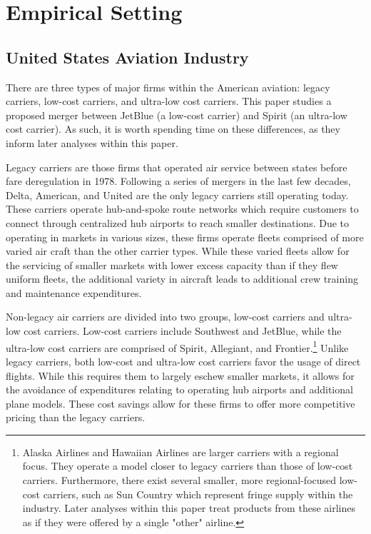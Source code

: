 \documentclass{article}
\begin{document}
	
	\section{Empirical Setting}
	\label{sec:Setting}
	
	
	\subsection{United States Aviation Industry}
	\label{sec:Setting_Aviation}
	There are three types of major firms within the American aviation: legacy carriers, low-cost carriers, and ultra-low cost carriers. This paper studies a proposed merger between JetBlue (a low-cost carrier) and Spirit (an ultra-low cost carrier). As such, it is worth spending time on these differences, as they inform later analyses within this paper. 	
    
	Legacy carriers are those firms that operated air service between states before fare deregulation in 1978. Following a series of mergers in the last few decades, Delta, American, and United are the only legacy carriers still operating today. These carriers operate hub-and-spoke route networks which require customers to connect through centralized hub airports to reach smaller destinations. Due to operating in markets in various sizes, these firms operate fleets comprised of more varied air craft than the other carrier types. While these varied fleets allow for the servicing of smaller markets with lower excess capacity than if they flew uniform fleets, the additional variety in aircraft leads to additional crew training and maintenance expenditures.   
	
	Non-legacy air carriers are divided into two groups, low-cost carriers and ultra-low cost carriers. Low-cost carriers include Southwest and JetBlue, while the ultra-low cost carriers are comprised of Spirit, Allegiant, and Frontier.\footnote{Alaska Airlines and Hawaiian Airlines are larger carriers with a regional focus. They operate a model closer to legacy carriers than those of low-cost carriers. Furthermore, there exist several smaller, more regional-focused low-cost carriers, such as Sun Country which represent fringe supply within the industry. Later analyses within this paper treat products from these airlines as if they were offered by a single "other" airline.} Unlike legacy carriers, both low-cost and ultra-low cost carriers favor the usage of direct flights. While this requires them to largely eschew smaller markets, it allows for the avoidance of expenditures relating to operating hub airports and additional plane models. These cost savings allow for these firms to offer more competitive pricing than the legacy carriers. %
\end{document}
